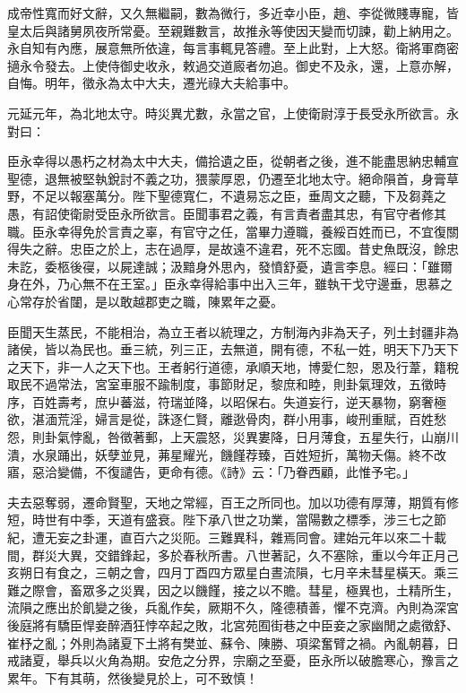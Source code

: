 \begin{pinyinscope}
成帝性寬而好文辭，又久無繼嗣，數為微行，多近幸小臣，趙、李從微賤專寵，皆皇太后與諸舅夙夜所常憂。至親難數言，故推永等使因天變而切諫，勸上納用之。永自知有內應，展意無所依違，每言事輒見答禮。至上此對，上大怒。衛將軍商密擿永令發去。上使侍御史收永，敕過交道廄者勿追。御史不及永，還，上意亦解，自悔。明年，徵永為太中大夫，遷光祿大夫給事中。

元延元年，為北地太守。時災異尤數，永當之官，上使衛尉淳于長受永所欲言。永對曰：

臣永幸得以愚朽之材為太中大夫，備拾遺之臣，從朝者之後，進不能盡思納忠輔宣聖德，退無被堅執銳討不義之功，猥蒙厚恩，仍遷至北地太守。絕命隕首，身膏草野，不足以報塞萬分。陛下聖德寬仁，不遺易忘之臣，垂周文之聽，下及芻蕘之愚，有詔使衛尉受臣永所欲言。臣聞事君之義，有言責者盡其忠，有官守者修其職。臣永幸得免於言責之辜，有官守之任，當畢力遵職，養綏百姓而已，不宜復關得失之辭。忠臣之於上，志在過厚，是故遠不違君，死不忘國。昔史魚既沒，餘忠未訖，委柩後寑，以屍達誠；汲黯身外思內，發憤舒憂，遺言李息。經曰：「雖爾身在外，乃心無不在王室。」臣永幸得給事中出入三年，雖執干戈守邊垂，思慕之心常存於省闥，是以敢越郡吏之職，陳累年之憂。

臣聞天生蒸民，不能相治，為立王者以統理之，方制海內非為天子，列土封疆非為諸侯，皆以為民也。垂三統，列三正，去無道，開有德，不私一姓，明天下乃天下之天下，非一人之天下也。王者躬行道德，承順天地，博愛仁恕，恩及行葦，籍稅取民不過常法，宮室車服不踰制度，事節財足，黎庶和睦，則卦氣理效，五徵時序，百姓壽考，庶屮蕃滋，符瑞並降，以昭保右。失道妄行，逆天暴物，窮奢極欲，湛湎荒淫，婦言是從，誅逐仁賢，離逖骨肉，群小用事，峻刑重賦，百姓愁怨，則卦氣悖亂，咎徵著郵，上天震怒，災異婁降，日月薄食，五星失行，山崩川潰，水泉踊出，妖孽並見，茀星耀光，饑饉荐臻，百姓短折，萬物夭傷。終不改寤，惡洽變備，不復譴告，更命有德。《詩》云：「乃眷西顧，此惟予宅。」

夫去惡奪弱，遷命賢聖，天地之常經，百王之所同也。加以功德有厚薄，期質有修短，時世有中季，天道有盛衰。陛下承八世之功業，當陽數之標季，涉三七之節紀，遭无妄之卦運，直百六之災阨。三難異科，雜焉同會。建始元年以來二十載間，群災大異，交錯鋒起，多於春秋所書。八世著記，久不塞除，重以今年正月己亥朔日有食之，三朝之會，四月丁酉四方眾星白晝流隕，七月辛未彗星橫天。乘三難之際會，畜眾多之災異，因之以饑饉，接之以不贍。彗星，極異也，土精所生，流隕之應出於飢變之後，兵亂作矣，厥期不久，隆德積善，懼不克濟。內則為深宮後庭將有驕臣悍妾醉酒狂悖卒起之敗，北宮苑囿街巷之中臣妾之家幽閒之處徵舒、崔杼之亂；外則為諸夏下土將有樊並、蘇令、陳勝、項梁奮臂之禍。內亂朝暮，日戒諸夏，舉兵以火角為期。安危之分界，宗廟之至憂，臣永所以破膽寒心，豫言之累年。下有其萌，然後變見於上，可不致慎！


\end{pinyinscope}
